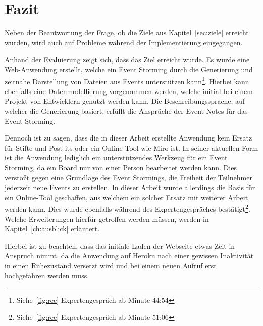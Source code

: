 \chapter{Fazit}\label{ch:fazit}
Neben der Beantwortung der Frage, ob die Ziele aus Kapitel~\ref{sec:ziele} erreicht wurden, wird auch auf Probleme während
der Implementierung eingegangen.

Anhand der Evaluierung zeigt sich, dass das Ziel erreicht wurde.
Es wurde eine Web-Anwendung erstellt, welche ein Event Storming durch die Generierung und zeitnahe Darstellung von Dateien aus Events unterstützen kann\footnote{Siehe~\ref{fig:rec} Expertengespräch ab Minute  44:54}.
Hierbei kann ebenfalls eine Datenmodellierung vorgenommen werden, welche initial bei einem Projekt von Entwicklern genutzt werden kann.
Die Beschreibungssprache, auf welcher die Generierung basiert, erfüllt die Ansprüche der Event-Notes für das Event Storming.

Dennoch ist zu sagen, dass die in dieser Arbeit erstellte Anwendung kein Ersatz für Stifte und Post-its oder ein Online-Tool wie Miro ist.
In seiner aktuellen Form ist die Anwendung lediglich ein unterstützendes Werkzeug für ein Event Storming, da ein Board nur von einer Person bearbeitet werden kann.
Dies verstößt gegen eine Grundlage des Event Stormings, die Freiheit der Teilnehmer jederzeit neue Events zu erstellen.
In dieser Arbeit wurde allerdings die Basis für ein Online-Tool geschaffen, aus welchem ein solcher Ersatz mit weiterer Arbeit werden kann.
Dies wurde ebenfalls während des Expertengespräches bestätigt\footnote{Siehe~\ref{fig:rec} Expertengespräch ab Minute  51:06}.
Welche Erweiterungen hierfür getroffen werden müssen, werden in Kapitel~\ref{ch:ausblick} erläutert.

Hierbei ist zu beachten, dass das initiale Laden der Webseite etwas Zeit in Anspruch nimmt, da die Anwendung auf Heroku nach einer gewissen
Inaktivität in einen Ruhezustand versetzt wird und bei einem neuen Aufruf erst hochgefahren werden muss.

